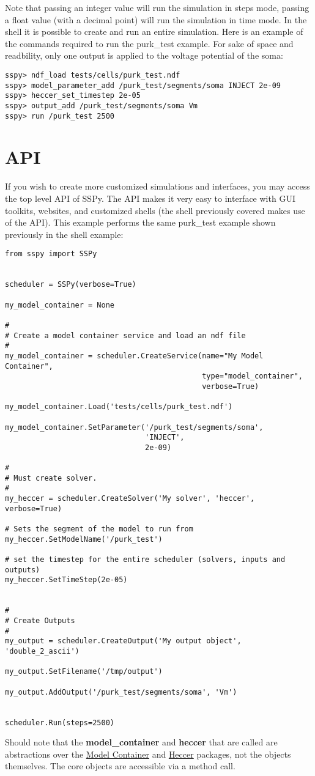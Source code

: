 \documentclass[12pt]{article}
\begin{document}
Note that passing an integer value will run the simulation in steps mode, passing a float value (with a decimal point) will run the simulation in time mode. In the shell it is possible to create and run an entire simulation. Here is an example of the commands required to run the purk\_test example. For sake of space and readbility, only one output is applied to the voltage potential of the soma:

\begin{verbatim}
sspy> ndf_load tests/cells/purk_test.ndf
sspy> model_parameter_add /purk_test/segments/soma INJECT 2e-09
sspy> heccer_set_timestep 2e-05
sspy> output_add /purk_test/segments/soma Vm
sspy> run /purk_test 2500
\end{verbatim}


\section*{API}

	If you wish to create more customized simulations and interfaces, you may access the top level API of SSPy. The API makes it very easy to interface with GUI toolkits, websites, and customized shells (the shell previously covered makes use of the API). This example performs the same purk\_test example shown previously in the shell example:
	
\begin{verbatim}
from sspy import SSPy 


scheduler = SSPy(verbose=True)

my_model_container = None

#
# Create a model container service and load an ndf file
#    
my_model_container = scheduler.CreateService(name="My Model Container",
                                             type="model_container",
                                             verbose=True)

my_model_container.Load('tests/cells/purk_test.ndf')

my_model_container.SetParameter('/purk_test/segments/soma',
                                'INJECT',
                                2e-09)

#
# Must create solver.
#
my_heccer = scheduler.CreateSolver('My solver', 'heccer', verbose=True)

# Sets the segment of the model to run from
my_heccer.SetModelName('/purk_test')

# set the timestep for the entire scheduler (solvers, inputs and outputs)
my_heccer.SetTimeStep(2e-05)


#
# Create Outputs
#
my_output = scheduler.CreateOutput('My output object', 'double_2_ascii')

my_output.SetFilename('/tmp/output')

my_output.AddOutput('/purk_test/segments/soma', 'Vm')


scheduler.Run(steps=2500)

\end{verbatim}

Should note that the {\bf model\_container} and {\bf heccer} that are called are abstractions over the \href{../model-container/model-container.tex}{Model Container} and \href{../heccer/heccer.tex}{Heccer} packages, not the objects themselves. The core objects are accessible via a method call. 
\end{document}
